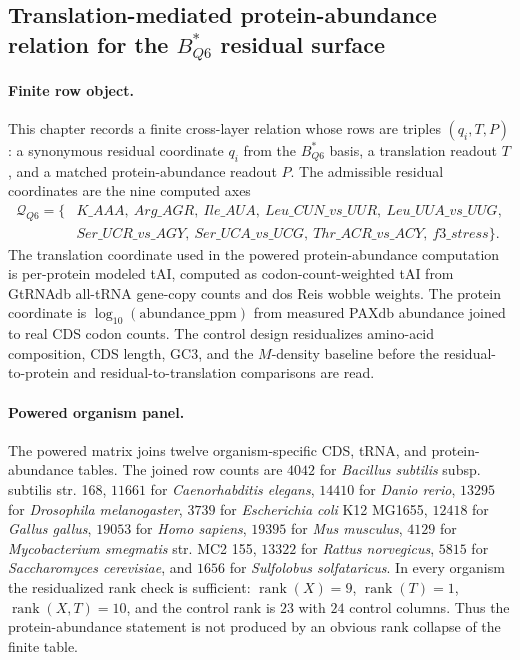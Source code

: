 \subsection{Translation-mediated protein-abundance relation for the $B^{*}_{Q6}$ residual surface}
\label{sec:q6-translation-mediated-protein-abundance-cross-layer}

\paragraph{Finite row object.}
This chapter records a finite cross-layer relation whose rows are triples $(q_i,T,P)$: a synonymous residual coordinate $q_i$ from the $B^{*}_{Q6}$ basis, a translation readout $T$, and a matched protein-abundance readout $P$. The admissible residual coordinates are the nine computed axes
$$
\begin{aligned}
\mathcal Q_{Q6}=\{&K\_AAA,\ Arg\_AGR,\ Ile\_AUA,\ Leu\_CUN\_vs\_UUR,\ Leu\_UUA\_vs\_UUG,\\
&Ser\_UCR\_vs\_AGY,\ Ser\_UCA\_vs\_UCG,\ Thr\_ACR\_vs\_ACY,\ f3\_stress\}.
\end{aligned}
$$
The translation coordinate used in the powered protein-abundance computation is per-protein modeled tAI, computed as codon-count-weighted tAI from GtRNAdb all-tRNA gene-copy counts and dos Reis wobble weights. The protein coordinate is $\log_{10}(\mathrm{abundance\_ppm})$ from measured PAXdb abundance joined to real CDS codon counts. The control design residualizes amino-acid composition, CDS length, GC3, and the $M$-density baseline before the residual-to-protein and residual-to-translation comparisons are read.

\paragraph{Powered organism panel.}
The powered matrix joins twelve organism-specific CDS, tRNA, and protein-abundance tables. The joined row counts are $4042$ for \emph{Bacillus subtilis} subsp. subtilis str. 168, $11661$ for \emph{Caenorhabditis elegans}, $14410$ for \emph{Danio rerio}, $13295$ for \emph{Drosophila melanogaster}, $3739$ for \emph{Escherichia coli} K12 MG1655, $12418$ for \emph{Gallus gallus}, $19053$ for \emph{Homo sapiens}, $19395$ for \emph{Mus musculus}, $4129$ for \emph{Mycobacterium smegmatis} str. MC2 155, $13322$ for \emph{Rattus norvegicus}, $5815$ for \emph{Saccharomyces cerevisiae}, and $1656$ for \emph{Sulfolobus solfataricus}. In every organism the residualized rank check is sufficient: $\operatorname{rank}(X)=9$, $\operatorname{rank}(T)=1$, $\operatorname{rank}(X,T)=10$, and the control rank is $23$ with $24$ control columns. Thus the protein-abundance statement is not produced by an obvious rank collapse of the finite table.


